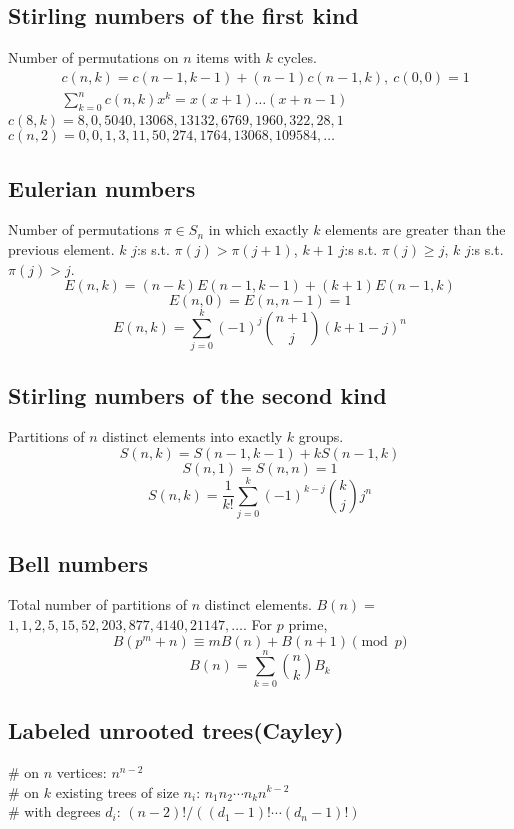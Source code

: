 	\subsection{Stirling numbers of the first kind}
		Number of permutations on $n$ items with $k$ cycles.
		\begin{align*}
			&c(n,k) = c(n-1,k-1) + (n-1) c(n-1,k),\ c(0,0) = 1 \\
			&\textstyle \sum_{k=0}^n c(n,k)x^k = x(x+1) \dots (x+n-1)
		\end{align*}
		$c(8,k) = 8, 0, 5040, 13068, 13132, 6769, 1960, 322, 28, 1$ \\
		$c(n,2) = 0, 0, 1, 3, 11, 50, 274, 1764, 13068, 109584, \dots$

	\subsection{Eulerian numbers}
		Number of permutations $\pi \in S_n$ in which exactly $k$ elements are greater than the previous element. $k$ $j$:s s.t. $\pi(j)>\pi(j+1)$, $k+1$ $j$:s s.t. $\pi(j)\geq j$, $k$ $j$:s s.t. $\pi(j)>j$.
		$$E(n,k) = (n-k)E(n-1,k-1) + (k+1)E(n-1,k)$$
		$$E(n,0) = E(n,n-1) = 1$$
		$$E(n,k) = \sum_{j=0}^k(-1)^j\binom{n+1}{j}(k+1-j)^n$$

	\subsection{Stirling numbers of the second kind}
		Partitions of $n$ distinct elements into exactly $k$ groups.
		$$S(n,k) = S(n-1,k-1) + k S(n-1,k)$$
		$$S(n,1) = S(n,n) = 1$$
		$$S(n,k) = \frac{1}{k!}\sum_{j=0}^k (-1)^{k-j}\binom{k}{j}j^n$$

	\subsection{Bell numbers}
		Total number of partitions of $n$ distinct elements. $B(n) =$
		$1, 1, 2, 5, 15, 52, 203, 877, 4140, 21147, \dots$. For $p$ prime,
		\[ B(p^m+n)\equiv mB(n)+B(n+1) \pmod{p} \]
    $$B(n) = \sum_{k=0}^n \binom{n}{k}B_k$$

	\subsection{Labeled unrooted trees(Cayley)}
		\# on $n$ vertices: $n^{n-2}$ \\
		\# on $k$ existing trees of size $n_i$: $n_1n_2\cdots n_k n^{k-2}$ \\
		\# with degrees $d_i$: $(n-2)! / ((d_1-1)! \cdots (d_n-1)!)$

